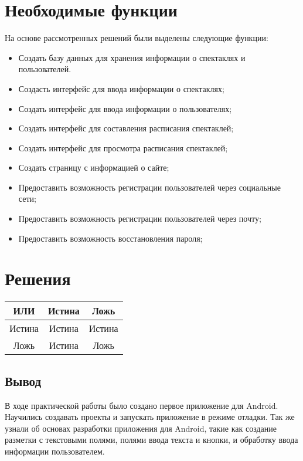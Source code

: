 \section{Необходимые функции}
На основе рассмотренных решений были выделены следующие функции:
\begin{itemize}
	\item Создать базу данных для хранения информации о спектаклях и пользователей.
	\item Создасть интерфейс для ввода информации о спектаклях;
	\item Создать интерфейс для ввода информации о пользователях;
	\item Создать интерфейс для составления расписания спектаклей;
	\item Создать интерфейс для просмотра расписания спектаклей;
	\item Создать страницу с информацией о сайте;
	\item Предоставить возможность регистрации пользователей через социальные сети;
	\item Предоставить возможность регистрации пользователей через почту;
	\item Предоставить возможность восстановления пароля;
\end{itemize}

\section{Решения}
\centering
\begin{tabular}{|*{3}{c|}}
	\textbf{ИЛИ} & Истина & Ложь \\[2mm]
	\hline\hline
	Истина & Истина & Истина \\
	Ложь & Истина & Ложь
\end{tabular}


\subsection*{Вывод}
В ходе практической работы было создано первое приложение для Android. Научились создавать проекты и запускать приложение в режиме отладки. Так же узнали об основах разработки приложения для Android, такие как создание разметки с текстовыми полями, полями ввода текста и кнопки, и обработку ввода информации пользователем.
